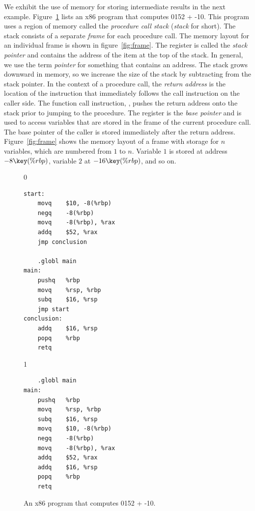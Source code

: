 \documentclass[7x10]{TimesAPriori_MIT}%
\def\racketEd{0}
\def\pythonEd{1}
\providecommand{\BookEdition}{1}
\let\edition\BookEdition
\newcommand{\racket}[1]{{\if\edition\racketEd{#1}\fi}}
\newcommand{\pythonColor}[0]{}
\newcommand{\python}[1]{{\if\edition\pythonEd\pythonColor #1\fi}}
\numberwithin{theorem}{chapter}
\numberwithin{definition}{chapter}
\numberwithin{equation}{chapter}
\begin{document}
We exhibit the use of memory for storing intermediate results in the
next example.  Figure~\ref{fig:p1-x86} lists an x86 program that
computes \racket{}\python{52 + -10}. This program
uses a region of memory called the \emph{procedure call stack}
(\emph{stack} for
short). 
The stack consists of a separate \emph{frame}
for each procedure call. The memory layout for an individual frame is
shown in figure~\ref{fig:frame}.  The register  is called the
\emph{stack pointer} and contains the
address of the item at the top of the stack.  In general, we use the
term \emph{pointer} for something that
contains an address. The stack grows downward in memory, so we
increase the size of the stack by subtracting from the stack pointer.
In the context of a procedure call, the \emph{return
  address} is the location of the
instruction that immediately follows the call instruction on the
caller side.  The function call instruction, , pushes the
return address onto the stack prior to jumping to the procedure.  The
register  is the \emph{base pointer} and is used to access variables that are stored in the
frame of the current procedure call.  The base pointer of the caller
is stored immediately after the return address.
Figure~\ref{fig:frame} shows the memory layout of a frame with storage
for $n$ variables, which are numbered from $1$ to $n$. Variable $1$ is
stored at address $-8\key{(\%rbp)}$, variable $2$ at
$-16\key{(\%rbp)}$, and so on.

\begin{figure}[tbp]
  \begin{minipage}{0.66\textwidth}
    \begin{tcolorbox}[colback=white]
      {\if\edition\racketEd
\begin{lstlisting}
start:
	movq	$10, -8(%rbp)
	negq	-8(%rbp)
	movq	-8(%rbp), %rax
	addq	$52, %rax
	jmp conclusion

	.globl main
main:
	pushq	%rbp
	movq	%rsp, %rbp
	subq	$16, %rsp
	jmp start
conclusion:
	addq	$16, %rsp
	popq	%rbp
	retq
\end{lstlisting}
\fi}
{\if\edition\pythonEd\pythonColor
\begin{lstlisting}
    .globl main
main:
    pushq	%rbp
    movq	%rsp, %rbp
    subq	$16, %rsp
    movq	$10, -8(%rbp)
    negq	-8(%rbp)
    movq	-8(%rbp), %rax
    addq	$52, %rax
    addq	$16, %rsp
    popq	%rbp
    retq
\end{lstlisting}
\fi}
  \end{tcolorbox}
  \end{minipage}
  \caption{An x86 program that computes
  \racket{}\python{52 + -10}.}
\label{fig:p1-x86}
\end{figure}
\end{document}

